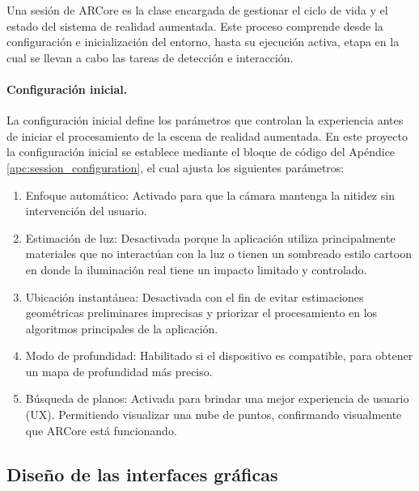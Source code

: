             Una sesión de ARCore es la clase encargada de gestionar el ciclo de vida y el estado del sistema de realidad aumentada. Este proceso comprende desde la configuración e inicialización del entorno, hasta su ejecución activa, etapa en la cual se llevan a cabo las tareas de detección e interacción.
            
            \paragraph{Configuración inicial.}
            
                La configuración inicial define los parámetros que controlan la experiencia antes de iniciar el procesamiento de la escena de realidad aumentada. En este proyecto la configuración inicial se establece mediante el bloque de código del Apéndice \ref{apc:session_configuration}, el cual ajusta los siguientes parámetros:

            \begin{enumerate}
                
                \item Enfoque automático: Activado para que la cámara mantenga la nitidez sin intervención del usuario.

                \item Estimación de luz: Desactivada porque la aplicación utiliza principalmente materiales que no interactúan con la luz o tienen un sombreado estilo cartoon en donde la iluminación real tiene un impacto limitado y controlado.

                \item Ubicación instantánea: Desactivada con el fin de evitar estimaciones geométricas preliminares imprecisas y priorizar el procesamiento en los algoritmos principales de la aplicación.

                \item Modo de profundidad: Habilitado si el dispositivo es compatible, para obtener un mapa de profundidad más preciso.
                
                \item Búsqueda de planos: Activada para brindar una mejor experiencia de usuario (UX). Permitiendo visualizar una nube de puntos, confirmando visualmente que ARCore está funcionando.

            \end{enumerate}

    \subsection{Diseño de las interfaces gráficas}

